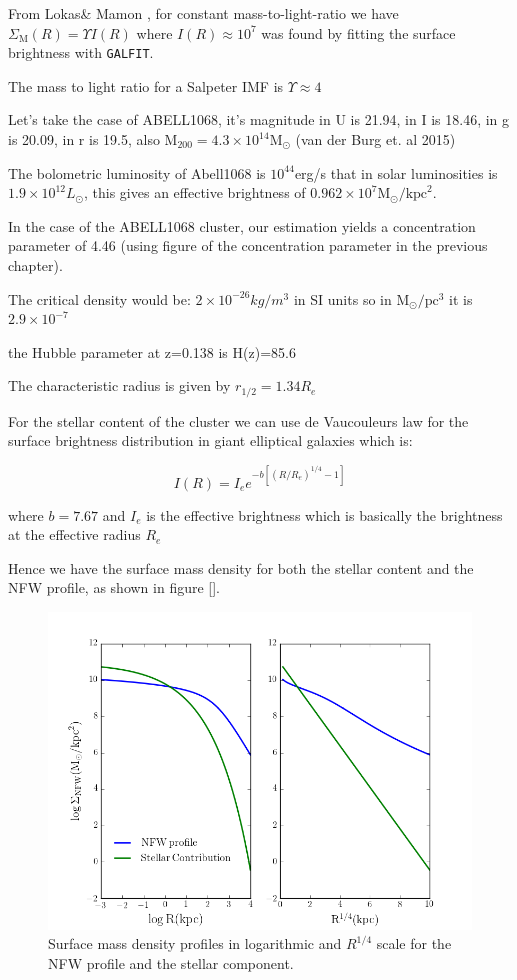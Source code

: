 From Lokas\& Mamon \citeyear{Reference14}, for constant mass-to-light-ratio we have $\Sigma_{\text{M}}(R)= \Upsilon I(R)$ where $I(R)\approx 10^{7}$ was found by fitting the surface brightness with \texttt{GALFIT}.

The mass to light ratio for a Salpeter IMF is $\Upsilon\approx 4$

Let's take the case of ABELL1068, it's magnitude in U is 21.94, in I is 18.46, in g is 20.09, in r is 19.5, also $\text{M}_{200}=4.3\times 10^{14}\text{M}_{\odot}$ (van der Burg et. al 2015)

The bolometric luminosity of Abell1068 is $10^{44}$erg/s that in solar luminosities is $1.9\times 10^{12} L_{\odot}$, this gives an effective brightness of $0.962\times 10^{7}\text{M}_{\odot}/\text{kpc}^2$.

In the case of the ABELL1068 cluster, our estimation yields a concentration parameter of 4.46 (using figure of the concentration parameter in the previous chapter).

The critical density would be: $2\times 10^{-26}kg/m^{3}$ in SI units so in $\text{M}_{\odot}/\text{pc}^{3}$ it is $2.9\times 10^{-7}$

the Hubble parameter at z=0.138 is H(z)=85.6

The characteristic radius is given by $r_{1/2}=1.34R_{e}$

For the stellar content of the cluster we can use de Vaucouleurs law for the surface brightness distribution in giant elliptical galaxies which is:

\begin{equation}
I(R)=I_{e}e^{-b\left[\left(R/R_{e}\right)^{1/4}-1\right]}
\end{equation}

where $b=7.67$ and $I_{e}$ is the effective brightness which is basically the brightness at the effective radius $R_{e}$

Hence we have the surface mass density for both the stellar content and the NFW profile, as shown in figure [].

\begin{figure}[H]
\centering
\includegraphics[width=12cm]{images/Surface_mass_density_log.png}
\caption[Surface mass density profiles]{Surface mass density profiles in logarithmic and $R^{1/4}$ scale for the NFW profile and the stellar component.}
\end{figure}

